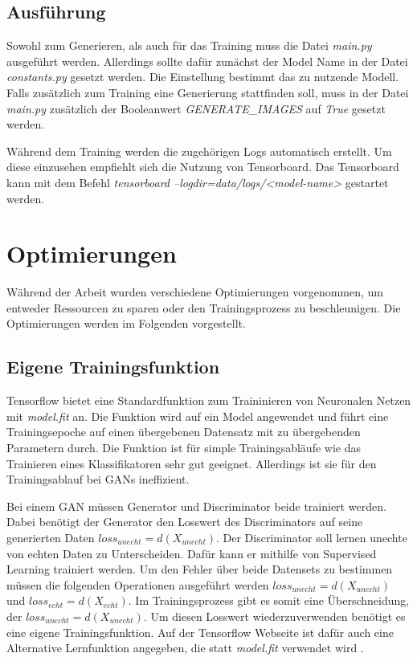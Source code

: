 \subsection{Ausführung}
Sowohl zum Generieren, als auch für das Training muss die Datei \textit{main.py} ausgeführt werden.
Allerdings sollte dafür zunächst der Model Name in der Datei \textit{constants.py} gesetzt werden.
Die Einstellung bestimmt das zu nutzende Modell.
Falls zusätzlich zum Training eine Generierung stattfinden soll, muss in der Datei \textit{main.py} zusätzlich der Booleanwert \textit{GENERATE\_IMAGES} auf \textit{True} gesetzt werden.
\newline

Während dem Training werden die zugehörigen Logs automatisch erstellt.
Um diese einzusehen empfiehlt sich die Nutzung von Tensorboard.
Das Tensorboard kann mit dem Befehl \textit{tensorboard --logdir=data/logs/<model-name>} gestartet werden.

\section{Optimierungen}
Während der Arbeit wurden verschiedene Optimierungen vorgenommen, um entweder Ressourcen zu sparen oder den Trainingsprozess zu beschleunigen.
Die Optimierungen werden im Folgenden vorgestellt.

\subsection{Eigene Trainingsfunktion}
Tensorflow bietet eine Standardfunktion zum Traininieren von Neuronalen Netzen mit \textit{model.fit} an.
Die Funktion wird auf ein Model angewendet und führt eine Trainingsepoche auf einen übergebenen Datensatz mit zu übergebenden Parametern durch.
Die Funktion ist für simple Trainingsabläufe wie das Trainieren eines Klassifikatoren sehr gut geeignet.
Allerdings ist sie für den Trainingsablauf bei GANs ineffizient.

Bei einem GAN müssen Generator und Discriminator beide trainiert werden.
Dabei benötigt der Generator den Losswert des Discriminators auf seine generierten Daten $loss_{unecht} = d(X_{unecht})$.
Der Discriminator soll lernen unechte von echten Daten zu Unterscheiden.
Dafür kann er mithilfe von Supervised Learning trainiert werden.
Um den Fehler über beide Datensets zu bestimmen müssen die folgenden Operationen ausgeführt werden $loss_{unecht} = d(X_{unecht})$ und $loss_{echt} = d(X_{echt})$.
Im Trainingsprozess gibt es somit eine Überschneidung, der $loss_{unecht} = d(X_{unecht})$.
Um diesen Losswert wiederzuverwenden benötigt es eine eigene Trainingsfunktion.
Auf der Tensorflow Webseite ist dafür auch eine Alternative Lernfunktion angegeben, die statt \textit{model.fit} verwendet wird \cite{tensorflow-gan-learn-step}.

